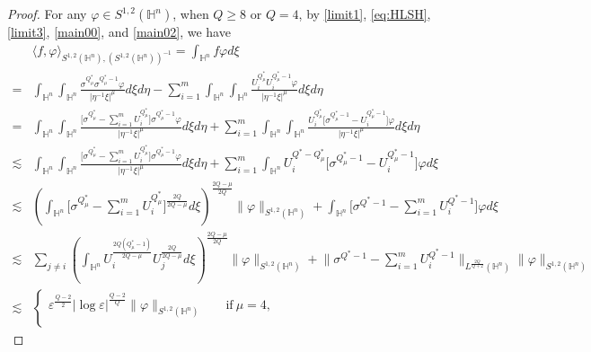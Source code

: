 \documentclass[10pt,a4paper]{amsart}
\begin{document}
\begin{proof}
For any $\varphi\in S^{1,2}(\mathbb{H}^{n})$, when $Q\geq8$ or $Q=4$, by \eqref{limit1}, \eqref{eq:HLSH}, \eqref{limit3}, \eqref{main00}, and \eqref{main02}, %
we have
\begin{align}\label{main20}
 &\langle f,\varphi\rangle_{S^{1,2}(\mathbb{H}^{n}),(S^{1,2}(\mathbb{H}^{n}))^{-1}} =\int_{\mathbb{H}^{n}}f\varphi d\xi \nonumber\\ =&\int_{\mathbb{H}^{n}}\int_{\mathbb{H}^{n}}\frac{\sigma^{Q^{\ast}_{\mu}}\sigma^{Q^{\ast}_{\mu}-1}\varphi}
{|\eta^{-1}\xi|^{\mu}}d\xi{d}\eta-\sum\limits_{i=1}^m
\int_{\mathbb{H}^{n}}\int_{\mathbb{H}^{n}}\frac{U_i^{Q^{\ast}_{\mu}}U_i^{Q^{\ast}_{\mu}-1}\varphi}
{|\eta^{-1}\xi|^{\mu}}d\xi{d}\eta \nonumber\\
=&\int_{\mathbb{H}^{n}}\int_{\mathbb{H}^{n}}\frac{\Big[\sigma^{Q^{\ast}_{\mu}}-\sum\limits_{i=1}^mU_i^{Q^{\ast}_{\mu}}\Big]\sigma^{Q^{\ast}_{\mu}-1}\varphi}
{|\eta^{-1}\xi|^{\mu}}d\xi{d}\eta+\sum\limits_{i=1}^m
\int_{\mathbb{H}^{n}}\int_{\mathbb{H}^{n}}\frac{U_i^{Q^{\ast}_{\mu}}\Big[\sigma^{Q^{\ast}_{\mu}-1}-U_i^{Q^{\ast}_{\mu}-1}\Big]\varphi}
{|\eta^{-1}\xi|^{\mu}}d\xi{d}\eta \nonumber\\
\lesssim &\int_{\mathbb{H}^{n}}\int_{\mathbb{H}^{n}}\frac{\Big[\sigma^{Q^{\ast}_{\mu}}-\sum\limits_{i=1}^mU_i^{Q^{\ast}_{\mu}}\Big]\sigma^{Q^{\ast}_{\mu}-1}\varphi}
{|\eta^{-1}\xi|^{\mu}}d\xi{d}\eta+\sum\limits_{i=1}^m
\int_{\mathbb{H}^{n}} U_i^{Q^*-Q^{\ast}_{\mu}}\Big[\sigma^{Q^{\ast}_{\mu}-1}-U_i^{Q^{\ast}_{\mu}-1}\Big]\varphi
d\xi \nonumber\\
\lesssim & \left(\int_{\mathbb{H}^{n}}\bigg[\sigma^{Q^{\ast}_{\mu}}-\sum\limits_{i=1}^mU_i^{Q^{\ast}_{\mu}}\bigg]^{\frac{2Q}{2Q-\mu}}d\xi\right)^{\frac{2Q-\mu}{2Q}}\|\varphi\|_{S^{1,2}(\mathbb{H}^{n})}
+\int_{\mathbb{H}^{n}} \bigg[\sigma^{Q^{*}-1}-\sum\limits_{i=1}^m U_i^{Q^*-1}\bigg]\varphi
d\xi \nonumber\\
\lesssim & \sum\limits_{j\neq i}\left(\int_{\mathbb{H}^{n}}U_i^{\frac{2Q(Q^{\ast}_{\mu}-1)}{2Q-\mu}}U_j
^{\frac{2Q}{2Q-\mu}}d\xi\right)^{\frac{2Q-\mu}{2Q}}\|\varphi\|_{S^{1,2}(\mathbb{H}^{n})}
+\bigg\| \sigma^{Q^{*}-1}-\sum\limits_{i=1}^m U_i^{Q^*-1}\bigg\|_{L^{\frac{2Q}{Q+2}}(\mathbb{H}^{n})}\|\varphi\|_{S^{1,2}(\mathbb{H}^{n})} \nonumber\\
\lesssim &
\begin{cases}
\varepsilon^{\frac{Q-2}{2}}|\log \varepsilon|^{\frac{Q-2}{Q}}\|\varphi\|_{S^{1,2}(\mathbb{H}^{n})} \quad & \mathrm{if} ~ \mu=4,\\

\end{cases}
\end{align}
\end{proof}
\end{document}
